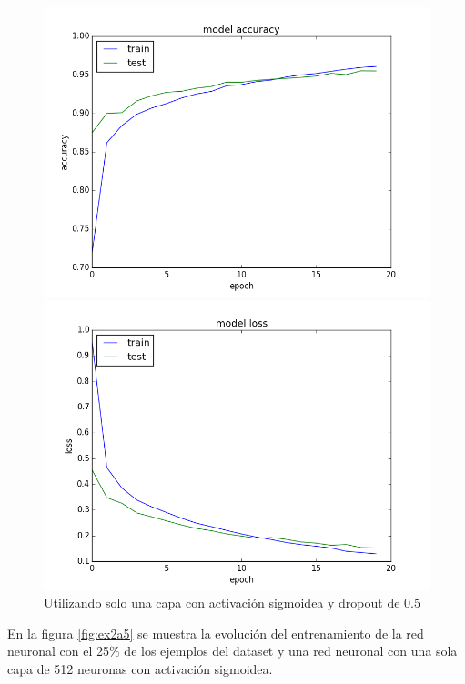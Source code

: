 \documentclass[11pt,spanish]{article}
\begin{document}
\begin{figure}[tpb]
\centering
\begin{minipage}{.5\textwidth}
  \centering
  \includegraphics[width=1\linewidth]{../ex2a4_acc.png}
\end{minipage}%
\begin{minipage}{.5\textwidth}
  \centering
  \includegraphics[width=1\linewidth]{../ex2a4_loss.png}
\end{minipage}
\caption{Utilizando solo una capa con activación sigmoidea y dropout de 0.5}
\label{fig:ex2a4}
\end{figure}

En la figura \ref{fig:ex2a5} se muestra la evolución del entrenamiento de la red neuronal con el 25\% de los ejemplos del dataset y una red neuronal con una sola capa de 512 neuronas con activación sigmoidea. 
\end{document}
